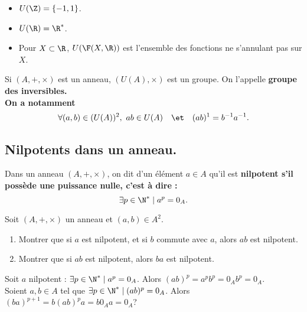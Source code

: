 \documentclass[11pt]{article}
\begin{document}
\begin{ex}{}{}
    \begin{itemize}
        \item $U(\Z)=\{-1,1\}$.
        \item $U(\R)=\R^*$.
        \item Pour $X\subset\R$, $U(\F(X,\R))$ est l'ensemble des fonctions ne s'annulant pas sur $X$.
    \end{itemize}
\end{ex}

\begin{prop}{}{}
    Si $(A,+,\times)$ est un anneau, $(U(A),\times)$ est un groupe. On l'appelle \bf{groupe des inversibles}.\\
    On a notamment
    \begin{equation*}
        \forall (a,b)\in(U(A))^2, ~ ab\in U(A) \quad\et\quad (ab)^{1}=b^{-1}a^{-1}.
    \end{equation*}
\end{prop}

\subsection{Nilpotents dans un anneau.}

\begin{defi}{}{}
    Dans un anneau $(A,+,\times)$, on dit d'un élément $a\in A$ qu'il est \bf{nilpotent} s'il possède une puissance nulle, c'est à dire :
    \begin{equation*}
        \exists p \in \N^* \mid a^p=0_A.
    \end{equation*}
\end{defi}

\begin{ex}{}{}
    Soit $(A,+,\times)$ un anneau et $(a,b)\in A^2$.
    \begin{enumerate}
        \item Montrer que si $a$ est nilpotent, et si $b$ commute avec $a$, alors $ab$ est nilpotent.
        \item Montrer que si $ab$ est nilpotent, alors $ba$ est nilpotent. 
    \end{enumerate}
    \tcblower
     Soit $a$ nilpotent : $\exists p \in \N^* \mid a^p = 0_A$. Alors $(ab)^p=a^pb^p=0_Ab^p=0_A$.\\
     Soient $a,b\in A$ tel que $\exists p \in \N^* \mid (ab)^p = 0_A$. Alors $(ba)^{p+1}=b(ab)^pa=b0_Aa=0_A$?
\end{ex}
\end{document}
